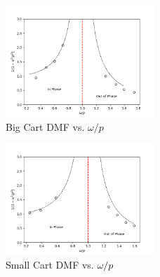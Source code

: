 \begin{figure}[H]
    \centering
    \includegraphics[width=0.5\textwidth]{matplotlib/big dmf vs omega over p.png}
    \caption{Big Cart DMF vs. $\omega/p$}
    \label{fig:Big DMF vs. Omega over P}
\end{figure}
\begin{figure}[H]
    \centering
    \includegraphics[width=0.5\textwidth]{matplotlib/small dmf vs omega over p.png}
    \caption{Small Cart DMF vs. $\omega/p$}
    \label{fig:Small DMF vs. Omega over P}
\end{figure}
